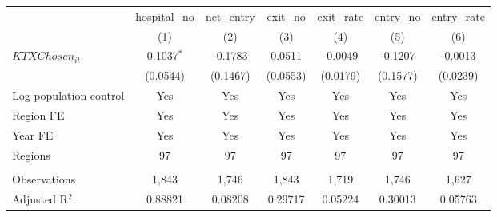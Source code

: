 \begingroup
\centering
\begin{tabular}{lcccccc}
   \toprule
                          & hospital\_no  & net\_entry  & exit\_no  & exit\_rate  & entry\_no  & entry\_rate \\    
                          & (1)           & (2)         & (3)       & (4)         & (5)        & (6)\\  
   \midrule 
   $KTXChosen_{it}$       & 0.1037$^{*}$  & -0.1783     & 0.0511    & -0.0049     & -0.1207    & -0.0013\\   
                          & (0.0544)      & (0.1467)    & (0.0553)  & (0.0179)    & (0.1577)   & (0.0239)\\   
   Log population control & Yes           & Yes         & Yes       & Yes         & Yes        & Yes\\  
   Region FE              & Yes           & Yes         & Yes       & Yes         & Yes        & Yes\\  
   Year FE                & Yes           & Yes         & Yes       & Yes         & Yes        & Yes\\  
   Regions                & 97            & 97          & 97        & 97          & 97         & 97\\  
    \\
   Observations           & 1,843         & 1,746       & 1,843     & 1,719       & 1,746      & 1,627\\  
   Adjusted R$^2$         & 0.88821       & 0.08208     & 0.29717   & 0.05224     & 0.30013    & 0.05763\\  
   \bottomrule
\end{tabular}
\par\endgroup
